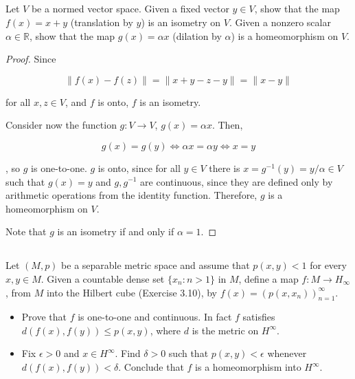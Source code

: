 \subsection{} Let $V$ be a normed vector space. Given a  fixed vector $y \in V$, show that the map $f(x) =  x + y$ (translation by $y$) is an isometry on $V$. Given a nonzero scalar $\alpha \in \mathbb{R}$, show that the map $g(x) = \alpha x$ (dilation by $\alpha$) is a homeomorphism on $V$.

\begin{proof}
Since 

$$ \|f(x) - f(z)\| = \|x+y - z - y\| = \|x-y\| $$

for all $x,z \in V$, and $f$ is onto, $f$ is an isometry.

\vspace{1em}

Consider now the function $g: V \rightarrow V$, $g(x) = \alpha x$. Then,

$$g(x) = g(y) \Leftrightarrow \alpha x = \alpha y  \Leftrightarrow x = y $$

, so $g$ is one-to-one. $g$ is onto, since for all $y \in V$ there is $x = g^{-1}(y) = y/\alpha \in V$ such that $g(x) = y$ and $g,g^{-1}$ are continuous, since they are defined only by arithmetic operations from the identity function. Therefore, $g$ is a homeomorphism on $V$.

Note that $g$ is an isometry if and only if $\alpha=1$.

\end{proof}


\vspace{35em}


\subsection{} Let $(M, p)$ be a separable metric space and assume that $p(x, y) < 1$ for every $x, y \in M$. Given a countable dense set $\{x_n : n > 1\}$ in $M$, define a map $f : M \rightarrow H_\infty$, from $M$ into the Hilbert cube (Exercise 3.10), by $f(x) = (p(x, x_n))_{n=1}^\infty$.

\begin{itemize}
    \item Prove that $f$ is one-to-one and continuous. In fact $f$ satisfies $d(f(x), f(y)) \leq p(x, y)$, where $d$ is the metric on $H^\infty$.
    \item Fix $\epsilon > 0$ and $x \in H^\infty$. Find $\delta > 0$ such that $p(x,y) < \epsilon$ whenever $d(f(x), f(y)) < \delta$. Conclude that $f$ is a homeomorphism into $H^\infty$. 
\end{itemize}


